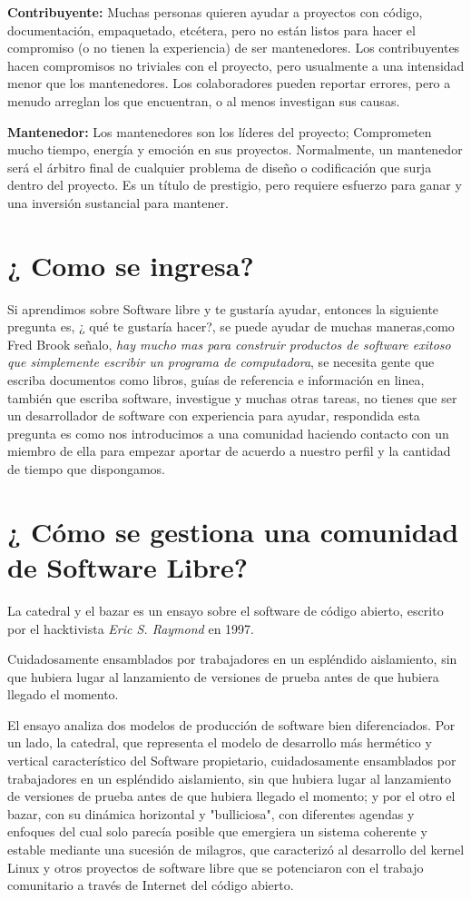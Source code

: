 \textbf{Contribuyente:} Muchas personas quieren ayudar a proyectos con código, documentación, empaquetado, etcétera, pero no están listos para hacer el compromiso (o no tienen la experiencia) de ser mantenedores. Los contribuyentes hacen compromisos no triviales con el proyecto, pero usualmente a una intensidad menor que los mantenedores. Los colaboradores pueden reportar errores, pero a menudo arreglan los que encuentran, o al menos investigan sus causas.

\textbf{Mantenedor:} Los mantenedores son los líderes del proyecto; Comprometen mucho tiempo, energía y emoción en sus proyectos. Normalmente, un mantenedor será el árbitro final de cualquier problema de diseño o codificación que surja dentro del proyecto. Es un título de prestigio, pero requiere esfuerzo para ganar y una inversión sustancial para mantener.


\section{¿ Como se ingresa?}
Si aprendimos sobre Software libre y te gustaría ayudar, entonces la siguiente pregunta es, ¿ qué te gustaría hacer?, se puede ayudar de muchas maneras,como Fred Brook señalo, \textit{hay mucho mas para construir productos de software exitoso que simplemente escribir un programa de computadora}, se necesita gente que escriba documentos como libros, guías de referencia e información en linea, también que escriba software, investigue y muchas otras tareas, no tienes que ser un desarrollador de software con experiencia para ayudar, respondida esta pregunta es como nos introducimos a una comunidad haciendo contacto con un miembro de ella para empezar aportar de acuerdo a nuestro perfil y la cantidad de tiempo que dispongamos.
 

\section{¿ Cómo se gestiona una comunidad de Software Libre?}
La catedral y el bazar es un ensayo sobre el software de código abierto, escrito por el hacktivista \textit{Eric S. Raymond} en 1997. 

Cuidadosamente ensamblados por trabajadores en un espléndido aislamiento, sin que hubiera lugar al lanzamiento de versiones de prueba antes de que hubiera llegado el momento.

El ensayo analiza dos modelos de producción de software bien diferenciados. Por un lado, la catedral, que representa el modelo de desarrollo más hermético y vertical característico del Software propietario, cuidadosamente ensamblados por trabajadores en un espléndido aislamiento, sin que hubiera lugar al lanzamiento de versiones de prueba antes de que hubiera llegado el momento; y por el otro el bazar, con su dinámica horizontal y "bulliciosa", con diferentes agendas y enfoques del cual solo parecía posible que emergiera un sistema coherente y estable mediante una sucesión de milagros, que caracterizó al desarrollo del kernel Linux y otros proyectos de software libre que se potenciaron con el trabajo comunitario a través de Internet del código abierto.

